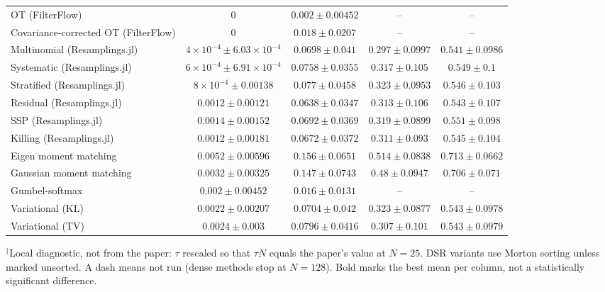 \begin{table}[H]
\begin{adjustbox}{max width=\linewidth}
\begin{tabular}{lcccc}
OT (FilterFlow) & $0$ & $0.002\pm0.00452$ & -- & -- \\
Covariance-corrected OT (FilterFlow) & $0$ & $0.018\pm0.0207$ & -- & -- \\
Multinomial (Resamplings.jl) & $4\times10^{-4}\pm6.03\times10^{-4}$ & $0.0698\pm0.041$ & $0.297\pm0.0997$ & $0.541\pm0.0986$ \\
Systematic (Resamplings.jl) & $6\times10^{-4}\pm6.91\times10^{-4}$ & $0.0758\pm0.0355$ & $0.317\pm0.105$ & $0.549\pm0.1$ \\
Stratified (Resamplings.jl) & $8\times10^{-4}\pm0.00138$ & $0.077\pm0.0458$ & $0.323\pm0.0953$ & $0.546\pm0.103$ \\
Residual (Resamplings.jl) & $0.0012\pm0.00121$ & $0.0638\pm0.0347$ & $0.313\pm0.106$ & $0.543\pm0.107$ \\
SSP (Resamplings.jl) & $0.0014\pm0.00152$ & $0.0692\pm0.0369$ & $0.319\pm0.0899$ & $0.551\pm0.098$ \\
Killing (Resamplings.jl) & $0.0012\pm0.00181$ & $0.0672\pm0.0372$ & $0.311\pm0.093$ & $0.545\pm0.104$ \\
Eigen moment matching & $\mathbf{0.0052\pm0.00596}$ & $0.156\pm0.0651$ & $0.514\pm0.0838$ & $0.713\pm0.0662$ \\
Gaussian moment matching & $0.0032\pm0.00325$ & $0.147\pm0.0743$ & $0.48\pm0.0947$ & $0.706\pm0.071$ \\
Gumbel-softmax & $0.002\pm0.00452$ & $0.016\pm0.0131$ & -- & -- \\
Variational (KL) & $0.0022\pm0.00207$ & $0.0704\pm0.042$ & $0.323\pm0.0877$ & $0.543\pm0.0978$ \\
Variational (TV) & $0.0024\pm0.003$ & $0.0796\pm0.0416$ & $0.307\pm0.101$ & $0.543\pm0.0979$ \\
\bottomrule
\end{tabular}
\end{adjustbox}
\par\smallskip\parbox{0.95\linewidth}{\footnotesize $^\dagger$Local diagnostic, not from the paper: $\tau$ rescaled so that $\tau N$ equals the paper's value at $N{=}25$. DSR variants use Morton sorting unless marked unsorted. A dash means not run (dense methods stop at $N{=}128$). Bold marks the best mean per column, not a statistically significant difference.}
\end{table}

